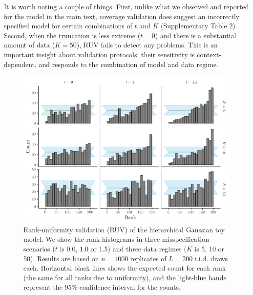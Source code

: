 \documentclass[oneside]{article}
\begin{document}
It is worth noting a couple of things.
First, unlike what we observed and reported for the model in the main text, coverage validation does suggest an incorrectly specified model for certain combinations of $t$ and $K$ (Supplementary Table 2).
Second, when the truncation is less extreme ($t = 0$) and there is a substantial amount of data ($K = 50$), RUV fails to detect any problems.
This is an important insight about validation protocols: their sensitivity is context-dependent, and responds to the combination of model and data regime.

\begin{figure}[!ht]
   \includegraphics[width=\linewidth]{../figures/sbc_normal_manual.pdf}
  \caption{Rank-uniformity validation (RUV) of the hierarchical Gaussian toy model.
  We show the rank histograms in three misspecification scenarios ($t$
  is 0.0, 1.0 or 1.5) and three data regimes ($K$ is 5, 10 or 50).
  Results are based on $n=1000$ replicates of $L= 200$ i.i.d. draws each.
  Horizontal black lines shows the expected count for each rank (the same for all ranks due to uniformity), and the light-blue bands represent the 95\%-confidence interval for the counts.
    }
  \label{supfig:ruv_normal_toy}
\end{figure}
\end{document}
